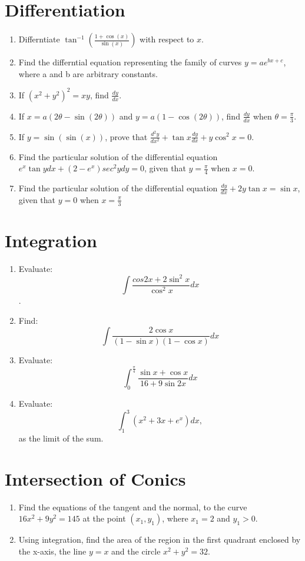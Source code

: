 \documentclass{article}
\providecommand{\brak}[1]{\ensuremath{\left(#1\right)}}
\begin{document}
\section{Differentiation}
\begin{enumerate}  
\item Differntiate $\tan^{-1} \brak{\frac{1+\cos(x)}{\sin(x)}}$ with respect to  $x$.
\item Find the differntial equation representing the family of curves $y=ae^{bx+c}$, where a and b are arbitrary constants.
\item If $\brak{x^{2}+y^{2}}^{2}=xy$, find $\frac{dy}{dx}$.
\item If $x=a\brak{2\theta - \sin \brak{2\theta}}$ and $y=a\brak{1-\cos\brak{2\theta}}$, find $\frac{dy}{dx}$
when $\theta = \frac{\pi}{3}$.
\item If $y=\sin \brak{\sin \brak{x}}$, prove that $\frac{d^{2}y}{dx^{2}}+\tan x \frac{dy}{dx}+y\cos^{2}x=0$.
\item Find the particular solution of the differential equation $e^{x}\tan y dx+\brak{2-e^{x}}sec^{2}y dy=0$, given that $y=\frac {\pi}{4}$ when $x=0$.
\item Find the particular solution of the differential equation $\frac {dy}{dx} +2y \tan x= \sin x$, given that $y=0$ when $x=\frac{\pi}{3}$	
\end{enumerate}
\section{Integration}
\begin{enumerate}
\item Evaluate: \[\int \frac{cos 2x + 2\sin^{2} x}{\cos^{2}x} dx\].	
\item Find: \[ \int \frac{2\cos x}{\brak{1-\sin x}\brak{1-\cos x}}dx \]
\item Evaluate:
	\[ \int_{0}^{\frac{\pi}{4}}\frac{\sin x + \cos x}{16 + 9 \sin 2x}dx \]
\item Evaluate:
	\[\int_{1}^{3} \brak{x^2 + 3x + e^x}dx, \]  as the limit of the sum.
\end{enumerate}
\section{Intersection of Conics}
\begin{enumerate}
\item Find the equations of the tangent and the normal, to the curve $16x^{2}+9y^{2}=145$ at the point $\brak{x_{1},y_{1}}$, where $x_{1}=2$ and $y_{1}>0$.
\item Using integration, find the area of the region in the first quadrant enclosed by the x-axis, the line $y = x$ and the circle $x^{2}+y^{2} = 32.$
\end{enumerate}
\end{document}
